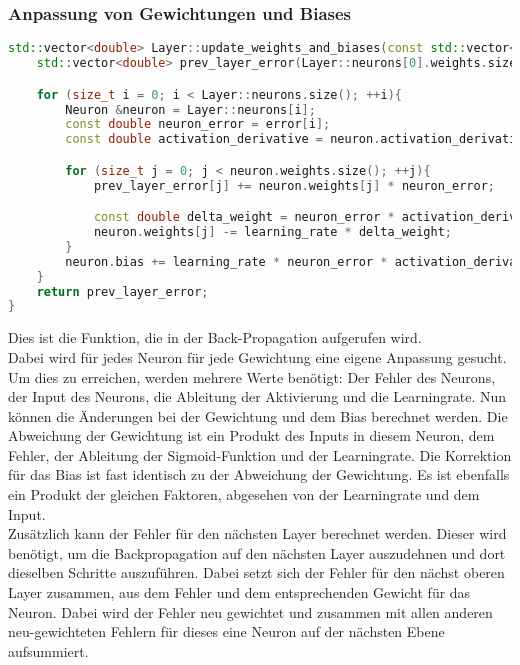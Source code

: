 \subsubsection{Anpassung von Gewichtungen und Biases}
\label{sec:RealAnpassungVonGewichtungenUndBiasesCode}
\begin{lstlisting}[language=C++]
std::vector<double> Layer::update_weights_and_biases(const std::vector<double>& error, double learning_rate){
    std::vector<double> prev_layer_error(Layer::neurons[0].weights.size(), 0.0);

    for (size_t i = 0; i < Layer::neurons.size(); ++i){
        Neuron &neuron = Layer::neurons[i];
        const double neuron_error = error[i];
        const double activation_derivative = neuron.activation_derivative();

        for (size_t j = 0; j < neuron.weights.size(); ++j){
            prev_layer_error[j] += neuron.weights[j] * neuron_error;

            const double delta_weight = neuron_error * activation_derivative * neuron.inputs[j];
            neuron.weights[j] -= learning_rate * delta_weight;
        }
        neuron.bias += learning_rate * neuron_error * activation_derivative;
    }
    return prev_layer_error;
}
\end{lstlisting}
Dies ist die Funktion, die in der Back-Propagation aufgerufen wird.
\\
Dabei wird für jedes Neuron für jede Gewichtung eine eigene Anpassung gesucht. Um dies zu erreichen, werden mehrere Werte benötigt: 
Der Fehler des Neurons, der Input des Neurons, die Ableitung der Aktivierung und die Learningrate.
Nun können die Änderungen bei der Gewichtung und dem Bias berechnet werden. Die Abweichung der Gewichtung ist ein Produkt des Inputs in diesem Neuron, dem Fehler, der Ableitung der Sigmoid-Funktion und der Learningrate. Die Korrektion für das Bias ist fast identisch zu der Abweichung der Gewichtung. Es ist ebenfalls ein Produkt der gleichen Faktoren, abgesehen von der Learningrate und dem Input.
\\
Zusätzlich kann der Fehler für den nächsten Layer berechnet werden. Dieser wird benötigt, um die Backpropagation auf den nächsten Layer auszudehnen und dort dieselben Schritte auszuführen. Dabei setzt sich der Fehler für den nächst oberen Layer zusammen, aus dem Fehler und dem entsprechenden Gewicht für das Neuron. Dabei wird der Fehler neu gewichtet und zusammen mit allen anderen neu-gewichteten Fehlern für dieses eine Neuron auf der nächsten Ebene aufsummiert.


